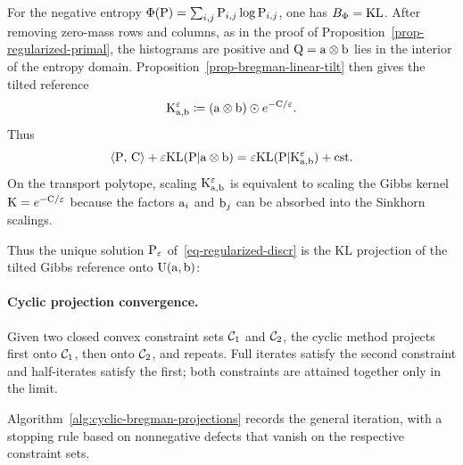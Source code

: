 For the negative entropy $\Phi(\P)=\sum_{i,j}\P_{i,j}\log\P_{i,j}$, one has $B_\Phi=\KLD$. After removing zero-mass rows and columns, as in the proof of Proposition~\ref{prop-regularized-primal}, the histograms are positive and $\Q=\a\otimes\b$ lies in the interior of the entropy domain. Proposition~\ref{prop-bregman-linear-tilt} then gives the tilted reference
\[
	\K_{\a,\b}^\epsilon
	\eqdef
	(\a\otimes\b)\odot e^{-\C/\epsilon}.
\]
Thus
\[
	\dotp{\P}{\C}+\epsilon\KLD(\P|\a\otimes\b)
	=
	\epsilon\KLD(\P|\K_{\a,\b}^\epsilon)+\text{\upshape cst}.
\]
On the transport polytope, scaling $\K_{\a,\b}^\epsilon$ is equivalent to scaling the Gibbs kernel $\K=e^{-\C/\epsilon}$ because the factors $\a_i$ and $\b_j$ can be absorbed into the Sinkhorn scalings.

Thus the unique solution $\P_\epsilon$ of~\eqref{eq-regularized-discr} is the KL projection of the tilted Gibbs reference onto $\CouplingsD(\a,\b)$:

\paragraph{Cyclic projection convergence.}

Given two closed convex constraint sets $\Cc_1$ and $\Cc_2$, the cyclic method projects first onto $\Cc_1$, then onto $\Cc_2$, and repeats. Full iterates satisfy the second constraint and half-iterates satisfy the first; both constraints are attained together only in the limit.

Algorithm~\ref{alg:cyclic-bregman-projections} records the general iteration, with a stopping rule based on nonnegative defects that vanish on the respective constraint sets.

